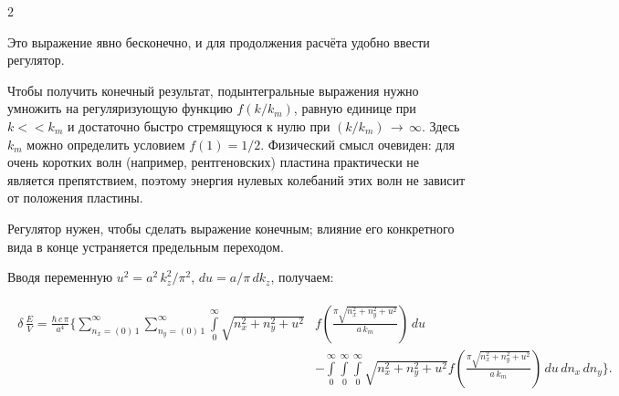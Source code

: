 \documentclass[twoside, 10pt]{article}
\begin{document}
\begin{multicols}{2}

    Это выражение явно бесконечно, и для продолжения расчёта удобно ввести регулятор.

    Чтобы получить конечный результат, подынтегральные выражения нужно умножить на регуляризующую функцию \(f(k/k_m)\), равную единице при \(k << k_m\) и достаточно быстро стремящуюся к нулю при \((k/k_m)\, \rightarrow\,\infty\). Здесь \(k_m\) можно определить условием \(f(1) = {1}/{2}\). Физический смысл очевиден: для очень коротких волн (например, рентгеновских) пластина практически не является препятствием, поэтому энергия нулевых колебаний этих волн не зависит от положения пластины.

    Регулятор нужен, чтобы сделать выражение конечным; влияние его конкретного вида в конце устраняется предельным переходом.

    Вводя переменную \(u^2 = a^2\,k_z^2/\pi^2\), \(du = a/\pi\,dk_z\), получаем:
\end{multicols}
\vspace{-3.5mm}
    \begin{equation} \label{eq:3}
\begin{array}{c}
\begin{array}{ll}
\delta\,\frac{E}{V} =
\frac{\hbar\,c\,\pi}{a^4}\Bigg\{
\sum\limits_{n_x=\left(0\right)\,1}^{\infty}
\sum\limits_{n_y=\left(0\right)\,1}^{\infty}
\int\limits_{0}^{\infty}
{\sqrt{n_x^2 + n_y^2 + u^2}} &
f\left(\frac{\pi\sqrt{n_x^2 + n_y^2 + u^2}}{a\,k_m}\right)
\,d{u} \\
\, &- \int\limits_{0}^{\infty}
\int\limits_{0}^{\infty}
\int\limits_{0}^{\infty}
{\sqrt{n_x^2 + n_y^2 + u^2}}
f\left(\frac{\pi\sqrt{n_x^2 + n_y^2 + u^2}}{a\,k_m}\right)
\,d{u}\,d{n_x}\,d{n_y}
\Bigg\}.
\end{array}
\end{array}
\end{equation}
\vspace{-3.5mm}
\end{document}
